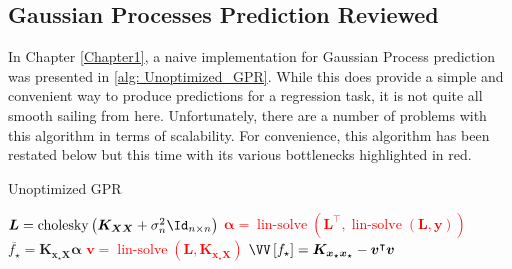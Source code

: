 \subsection{Gaussian Processes Prediction Reviewed}\label{Section5.1}

In Chapter \ref{Chapter1}, a naive implementation for Gaussian Process prediction was presented in \cref{alg: Unoptimized_GPR}. While this does provide a simple and convenient way to produce predictions for a regression task, it is not quite all smooth sailing from here. Unfortunately, there are a number of problems with this algorithm in terms of scalability. For convenience, this algorithm has been restated below but this time with its various bottlenecks highlighted in red.

\setcounter{savecounter}{\value{algocf}}
\setcounter{algocf}{\value{GPRcount}}

{\centering
    \begin{minipage}{.85\linewidth}

        \begin{algorithm*}[H]
            \caption{Unoptimized GPR}
            \SetAlgoLined
            \DontPrintSemicolon

            \BlankLine
            \textcolor{red}{$\bm{L} = \operatorname{cholesky} \left( \bm{K_{XX}} + \sigma_n^2 \Id_{n \times n} \right)$}\;
            \textcolor{red}{$\bm{\alpha} = \operatorname{lin-solve} \left( \bm{L}^{\intercal} , \operatorname{lin-solve} \left( \bm{L}, \bm{y} \right) \right)$}\;
            $\overline{f_{\star}} = \bm{K_{x_{\star} X}} \bm{\alpha}$\;
            \textcolor{red}{$\bm{v} = \operatorname{lin-solve} \left( \bm{L}, \bm{K_{x_{\star} X}} \right)$}\;
            $\VV \left[ f_{\star} \right] = \bm{K_{x_{\star} x_{\star}}} - \bm{v}^{\intercal} \bm{v}$\;
            \BlankLine
        \end{algorithm*}
    \end{minipage}
    \par
}

\setcounter{algocf}{\value{savecounter}}

